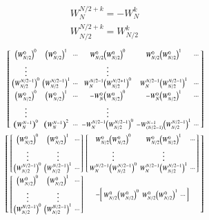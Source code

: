 \documentclass[journal,12pt,twocolumn]{IEEEtran}
\renewcommand\thesection{\arabic{section}}
\begin{document}
\begin{enumerate}[label=\arabic*.,ref=\thesection.\theenumi]
\begin{align}
		W_{N}^{N/2+k} = -W_{N}^{k}\\
		W_{N/2}^{N/2+k} = W_{N/2}^{k}
\end{align}
\begin{align}
	\begin{bsmallmatrix}
		\brak{W_{N/2}^{0}}^{0}	&	\brak{W_{N/2}^{0}}^{1}	&	\cdots	&	W_{N/2}^0\brak{W_{N/2}^{0}}^{0}	&	W_{N/2}^0\brak{W_{N/2}^{0}}^{1}	&	\cdots\\
		\vdots	&&& \vdots\\
		\brak{W_{N/2}^{N/2 - 1}}^{0}	&	\brak{W_{N/2}^{N/2 - 1}}^{1}	&	\cdots	&	W_{N}^{N/2-1}\brak{W_{N/2}^{N/2 + 1}}^{0}	&	W_{N}^{N/2-1}\brak{W_{N/2}^{N/2 -1}}^{1}	&	\cdots\\
		\brak{W_{N/2}^{0}}^{0}	&	\brak{W_{N/2}^{0}}^{1}	&	\cdots	&	-W_{N}^{0}\brak{W_{N/2}^{0}}^{0}	&	-W_{N}^{0}\brak{W_{N/2}^{0}}^{1}	&	\cdots\\
		\vdots	&&& \vdots\\
		\brak{W_{N}^{N-1}}^{0}	&	\brak{W_{N}^{N-1}}^{2}	&	\cdots	&	-W_{N}^{ N/2-1}\brak{W_{N/2}^{N/2-1}}^{0}	&	-W_{(N/2-1)}^{N-1}\brak{W_{N/2}^{N/2-1}}^{1}	&	\cdots
	\end{bsmallmatrix}\\
	\begin{bsmallmatrix}
		\begin{bsmallmatrix}
			\brak{W_{N/2}^{0}}^{0}	&	\brak{W_{N/2}^{0}}^{1} 	&	\cdots\\
					\vdots	& \vdots\\
			\brak{W_{N/2}^{N/2 - 1}}^{0}	&	\brak{W_{N/2}^{N/2 - 1}}^{1}	&	\cdots	
		\end{bsmallmatrix} & 
		\begin{bsmallmatrix}
			W_{N/2}^0\brak{W_{N/2}^{0}}^{0}	&	W_{N/2}^0\brak{W_{N/2}^{0}}^{1}	&	\cdots\\
					\vdots	& \vdots\\
			W_{N}^{N/2-1}\brak{W_{N/2}^{N/2 - 1}}^{0}	&	W_{N}^{N/2-1}\brak{W_{N/2}^{N/2 -1}}^{1}	&	\cdots\\
		\end{bsmallmatrix}\\
		\begin{bsmallmatrix}
			\brak{W_{N/2}^{0}}^{0}	&	\brak{W_{N/2}^{0}}^{1} 	&	\cdots\\
			\vdots	& \vdots\\
			\brak{W_{N/2}^{N/2 - 1}}^{0}	&	\brak{W_{N/2}^{N/2 - 1}}^{1}	&	\cdots	
		\end{bsmallmatrix} &
		-\begin{bsmallmatrix}
			W_{N/2}^0\brak{W_{N/2}^{0}}^{0}	&	W_{N/2}^0\brak{W_{N/2}^{0}}^{1}	&	\cdots\\

\end{bsmallmatrix}
\end{bsmallmatrix}
\end{align}
\end{enumerate}
\end{document}
